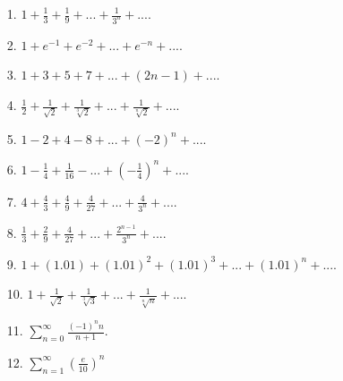 \documentclass[oneside,a4paper,12pt]{article}
\begin{document}
\begin{multicols}{2}
	
\begin{itemize}
\item[1.] $1+\frac{1}{3}+\frac{1}{9} +...+\frac{1}{3^{n}}+...$.
\end{itemize}
\begin{itemize}
\item[2.] $1+e^{-1}+e^{-2}+ ...+e^{-n}+...$. 
 \end{itemize}
 \begin{itemize}
\item [3.]$1+3+5+7+...+(2n-1)+...$.
\end{itemize}
\begin{itemize}
\item[4.] $\frac{1}{2}+\frac{1}{\sqrt{2}}+\frac{1}{\sqrt[3]{2}}+...+\frac{1}{\sqrt[n]{2}}+...$.
\end{itemize}
\begin{itemize}
\item[5.] $1-2+4-8+...+(-2)^{n}+...$.
\end{itemize}
\begin{itemize}
	\item[6.] $1-\frac{1}{4}+\frac{1}{16}-...+(-\frac{1}{4})^{n}+...$.
\end{itemize}
\begin{itemize}
	\item[7.] $4+\frac{4}{3}+\frac{4}{9}+\frac{4}{27}+...+\frac{4}{3^{n}}+...$.
\end{itemize}
\begin{itemize}
	\item[8.] $\frac{1}{3}+\frac{2}{9}+\frac{4}{27}+...+\frac{2^{n-1}}{3^{n}}+...$.
\end{itemize}
\begin{itemize}
	\item[9.] $1+(1.01)+(1.01)^{2}+(1.01)^{3}+...+(1.01)^{n}+...$.
\end{itemize}
\begin{itemize}
	\item[10.] $1+\frac{1}{\sqrt{2}}+\frac{1}{\sqrt[3]{3}}+...+\frac{1}{\sqrt[n]{n}}+...$.
\end{itemize}
\begin{itemize}
	\item[11.] $\sum_{n=0}^{\infty}\frac{(-1)^{n}n}{n+1}$.
\end{itemize}
\begin{itemize}
	\item [12.] $\sum_{n=1}^{\infty}(\frac{e}{10})^{n}$

\end{itemize}
\end{multicols}
\end{document}

